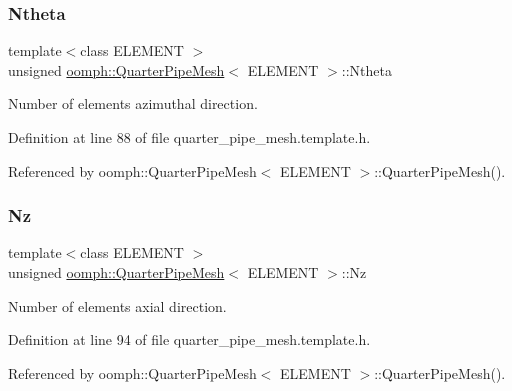 \subsubsection{\texorpdfstring{Ntheta}{Ntheta}}
{\footnotesize\ttfamily template$<$class E\+L\+E\+M\+E\+NT $>$ \\
unsigned \hyperlink{classoomph_1_1QuarterPipeMesh}{oomph\+::\+Quarter\+Pipe\+Mesh}$<$ E\+L\+E\+M\+E\+NT $>$\+::Ntheta\hspace{0.3cm}{\ttfamily [protected]}}



Number of elements azimuthal direction. 



Definition at line 88 of file quarter\+\_\+pipe\+\_\+mesh.\+template.\+h.



Referenced by oomph\+::\+Quarter\+Pipe\+Mesh$<$ E\+L\+E\+M\+E\+N\+T $>$\+::\+Quarter\+Pipe\+Mesh().

\mbox{\label{classoomph_1_1QuarterPipeMesh_a43bdaa4d81e936615332c5d43e347413}} 
\subsubsection{\texorpdfstring{Nz}{Nz}}
{\footnotesize\ttfamily template$<$class E\+L\+E\+M\+E\+NT $>$ \\
unsigned \hyperlink{classoomph_1_1QuarterPipeMesh}{oomph\+::\+Quarter\+Pipe\+Mesh}$<$ E\+L\+E\+M\+E\+NT $>$\+::Nz\hspace{0.3cm}{\ttfamily [protected]}}



Number of elements axial direction. 



Definition at line 94 of file quarter\+\_\+pipe\+\_\+mesh.\+template.\+h.



Referenced by oomph\+::\+Quarter\+Pipe\+Mesh$<$ E\+L\+E\+M\+E\+N\+T $>$\+::\+Quarter\+Pipe\+Mesh().

\mbox{\label{classoomph_1_1QuarterPipeMesh_ab080d887f508016140bac78d82be37d4}} 
